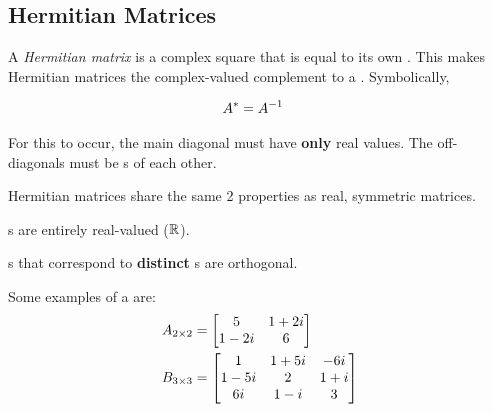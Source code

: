 \subsection{Hermitian Matrices}\label{subsec:Hermitian_Matrices}
\begin{definition}\label{def:Hermitian_Matrix}
  A \emph{Hermitian matrix} is a complex square  that is equal to its own .
  This makes Hermitian matrices the complex-valued complement to a .
  Symbolically,

  \begin{equation}\label{eq:Hermitian_Matrix}
    \begin{aligned}
      A^{*} &= A^{-1}
    \end{aligned}
  \end{equation}

  For this to occur, the main diagonal must have \textbf{only} real values.
  The off-diagonals must be s of each other.

  Hermitian matrices share the same 2 properties as real, symmetric matrices.
  \begin{propertylist}
  \item {}s are entirely real-valued ($\operatorname{\mathbb{R}}$).\label{prop:Hermitian_Matrix-Real_Eigenvalues}
  \item {}s that correspond to \textbf{distinct} s are orthogonal.\label{prop:Hermitian_Matrix-Orthogonal_Eigenvectors}
  \end{propertylist}
\end{definition}

Some examples of a  are:
\begin{align*}
  A_{2 \times 2} &=
                \begin{bmatrix}
                  5 & 1 + 2i \\
                  1 - 2i & 6
                \end{bmatrix} \\
  B_{3 \times 3} &=
                \begin{bmatrix}
                  1 & 1 + 5i & -6i \\
                  1 - 5i & 2 & 1 + i \\
                  6i & 1 - i & 3
                \end{bmatrix}
\end{align*}


